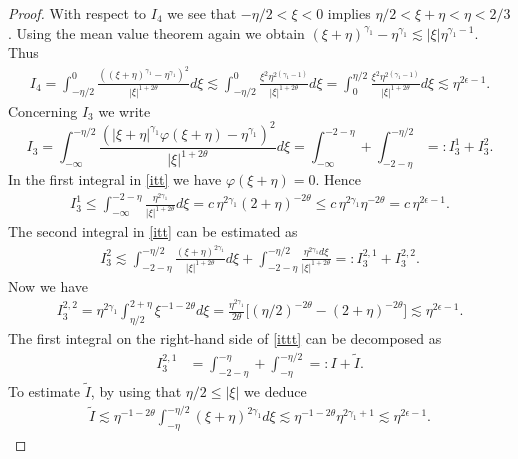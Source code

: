 \documentclass[reqno]{amsart}
\newcommand{\les}{\lesssim}
\numberwithin{equation}{section}
\begin{document}
\begin{proof}
With respect to $I_4$ we see that $-\eta/2<\xi<0$ implies $\eta/2<\xi+\eta<\eta<2/3$. Using the mean value theorem again we obtain $(\xi+\eta)^{\gamma_1}-\eta^{\gamma_1}\les |\xi|\eta^{\gamma_1 -1}$.
	Thus
	\begin{equation*}
	\begin{split}
	I_4=\int_{-\eta/2}^0 \frac{((\xi+\eta)^{\gamma_1}-\eta^{\gamma_1})^2}{|\xi|^{1+2\theta}}d\xi
	   \les \int_{-\eta/2}^0\frac{\xi^2 \eta^{2(\gamma_1-1)}}{|\xi|^{1+2\theta}}d\xi
	   =\int_0^{\eta/2}\frac{\xi^2 \eta^{2(\gamma_1-1)}}{|\xi|^{1+2\theta}}d\xi
	   \les \eta^{2\epsilon-1}.
     \end{split}
	\end{equation*}
	Concerning $I_3$ we write
	\begin{equation}\label{itt}
	I_3=\int_{-\infty}^{-\eta/2}\frac{(|\xi+\eta|^{\gamma_1}\varphi(\xi+\eta)-\eta^{\gamma_1})^2}{|\xi|^{1+2\theta}}d\xi=\int_{-\infty}^{-2-\eta}+\int_{-2-\eta}^{-\eta/2}=:I_3^1+I_3^2.
    \end{equation}		
In the first integral in \eqref{itt} we have $\varphi(\xi+\eta)=0$. Hence
	\begin{equation*}
	\begin{split}
	I_3^1\leq \int_{-\infty}^{-2-\eta}\frac{\eta^{2\gamma_1}}{|\xi|^{1+2\theta}}d\xi
	=c\,\eta^{2\gamma_1}(2+\eta)^{-2\theta}
	\leq c\, \eta^{2\gamma_1}\eta^{-2\theta}
	=c\,\eta^{2\epsilon-1}.
	\end{split}
	\end{equation*}
	The second integral in \eqref{itt} can be estimated as
	\begin{equation}
	\begin{split}\label{ittt}
	I_3^2\les \int_{-2-\eta}^{-\eta/2}\frac{(\xi+\eta)^{2\gamma_1}}{|\xi|^{1+2\theta}}d\xi+\int_{-2-\eta}^{-\eta/2}\frac{\eta^{2\gamma_1}d\xi}{|\xi|^{1+2\theta}}
	=:I_3^{2,1}+I_3^{2,2}.
	\end{split}
	\end{equation}
Now we have
    \begin{equation*}
	\begin{split}
	I_3^{2,2}=\eta^{2\gamma_1}\int_{\eta/2}^{2+\eta}\xi^{-1-2\theta}d\xi
	=\frac{\eta^{2\gamma_1}}{2\theta}\Big[(\eta/2)^{-2\theta}-(2+\eta)^{-2\theta}\Big]
	\les \eta^{2\epsilon-1}.
	\end{split}
	\end{equation*}
The first integral on the right-hand side of \eqref{ittt} can be decomposed as 
 \begin{equation*}
	\begin{split}
	I_3^{2,1}&=\int_{-2-\eta}^{-\eta}+\int_{-\eta}^{-\eta/2}=:I+\tilde I.
	\end{split}
	\end{equation*}
To estimate  $\tilde I$, by using that $\eta/2\leq |\xi|$ we deduce
\begin{equation*}
	\begin{split}
	\tilde I
	\les \eta^{-1-2\theta}\int_{-\eta}^{-\eta/2}(\xi+\eta)^{2\gamma_1}d\xi
\les 	\eta^{-1-2\theta} \eta^{2\gamma_1+1}
\les \eta^{2\epsilon-1}.
	\end{split}
	\end{equation*}


\end{proof}
\end{document}
